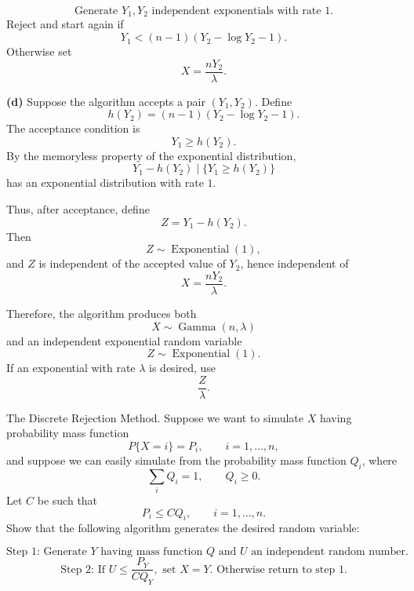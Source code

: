 {\[
\text{Generate }Y_1,Y_2\text{ independent exponentials with rate }1.
\]
Reject and start again if
\[
Y_1<(n-1)(Y_2-\log Y_2-1).
\]
Otherwise set
\[
X=\frac{nY_2}{\lambda}.
\]

\textbf{(d)} Suppose the algorithm accepts a pair $(Y_1,Y_2)$. Define
\[
h(Y_2)=(n-1)(Y_2-\log Y_2-1).
\]
The acceptance condition is
\[
Y_1\ge h(Y_2).
\]
By the memoryless property of the exponential distribution,
\[
Y_1-h(Y_2)\mid \{Y_1\ge h(Y_2)\}
\]
has an exponential distribution with rate $1$.

Thus, after acceptance, define
\[
Z=Y_1-h(Y_2).
\]
Then
\[
Z\sim \operatorname{Exponential}(1),
\]
and $Z$ is independent of the accepted value of $Y_2$, hence independent of
\[
X=\frac{nY_2}{\lambda}.
\]

Therefore, the algorithm produces both
\[
X\sim \operatorname{Gamma}(n,\lambda)
\]
and an independent exponential random variable
\[
Z\sim \operatorname{Exponential}(1).
\]
If an exponential with rate $\lambda$ is desired, use
\[
\frac{Z}{\lambda}.
\]
}

\setcounter{exercise}{12}
\begin{exercise}
\label{ex:simulation-13}
The Discrete Rejection Method. Suppose we want to simulate $X$ having probability mass function
\[
P\{X=i\}=P_i,\qquad i=1,\ldots,n,
\]
and suppose we can easily simulate from the probability mass function $Q_i$, where
\[
\sum_i Q_i=1,\qquad Q_i\ge 0.
\]
Let $C$ be such that
\[
P_i\le CQ_i,\qquad i=1,\ldots,n.
\]
Show that the following algorithm generates the desired random variable:

\[
\text{Step 1: Generate }Y\text{ having mass function }Q\text{ and }U\text{ an independent random number.}
\]
\[
\text{Step 2: If }U\le \frac{P_Y}{CQ_Y},\text{ set }X=Y.
\text{ Otherwise return to step 1.}
\]
\end{exercise}


